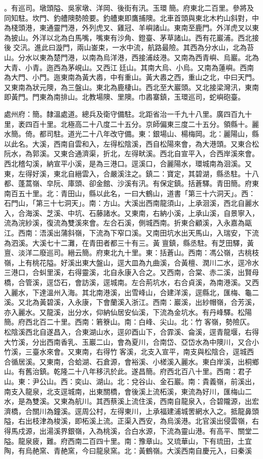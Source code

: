 \begin{pinyinscope}
。有巡司。墩頭隘、吳家墩、洋岡、後街有汛。玉環簡。府東北二百里。參將及同知駐。坎門、釣艚隩勢險要。釣艚東即鷹捕隩。北車首頭與東北木杓山斜對，中為棧頭港，東通靈門港，外列虎叉、雞冠、羊嶼諸山。東南至鹿門。外洋虎叉以東為披山。外洋以北為白馬嘴，嘴東有沙角、鐙臺、茅草諸山。西有花巖浦。西北接後交汛。進此曰漩門，兩山崟束，一水中流，航路最險。其西為分水山，北為苔山。分水以東為楚門港，以南為烏洋港，西接浦歧港。又南為西青嶼、烏巖。北為大青、小青。迤西為茅峴山。又西江廷山。其南大烏、小烏。又南為蓮嶼。西南為大門、小門。迤東南為黃大嶴，中有重山。黃大嶴之西，重山之北，中曰天門。又東南為狀元隩，為三盤山。東北為鹿棲山。西北至大巖頭。又北接梁灣汛，東南即黃門。門東為南排山。北教場隩、里隩。巾嶴寨鎮，玉環巡司，蛇嶼砲臺。

處州府：簡。隸溫處道。總兵及衛守備駐。北距省治一千九十八里。廣四百九十里，袤四百十里。北極高二十八度二十五分。京師偏東三度二十五分。領縣十。麗水簡。倚。都司駐。道光二十八年改守備。東：銀場山、楊梅岡。北：麗陽山，縣以此名。大溪，西南自雲和入，左得松陰溪，西自松陽來會，為大港頭。又東合松阮水，為郭溪。又東合通濟渠，折北，左得畎溪。西北自宣平入，合西岸溪來會。西北稽勾溪，納宣平小溪，是為三港口。逕溪口，合麗陽水，環城南為洄溪。又東，左得好溪，東北自縉雲入，合嚴溪注之。鎮二：寶定，其碧湖，縣丞駐。十八都、蓬蒿嶺、皁阮、庫頭、卻金館、沙溪有汛。有保定鎮。括蒼驛。青田簡。府東南百五十里。北：青田山，縣以此名，一曰大鶴山，道書「第三十六洞天」。西：石門山，「第三十七洞天」。南：方山。大溪出西南龍須山，上承洄溪，西北自麗水入，合海溪、芝溪、中坑、石藤諸水。又東南，右納小溪，上承山溪，自景寧入，流為浣紗溪，復流為雙溪來會。左合石溪，側城西南。折東合顧溪，入永嘉為甌江。西南：浯溪出蒲斜嶺，下流為下窄口溪。又南田坑水出天馬山，入瑞安，下流為泗溪。大溪七十二灘，在青田者都三十有三。黃亶鎮，縣丞駐。有芝田驛，黃亶、淡洋二廢巡司。縉云簡。府東北九十里。東：括蒼山。西南：馮公嶺，古桃枝嶺，上有桃花隘。好溪出東大盤山，逕大皿為九曲溪，合黃檀、潤川二水，逕冷水三港口，合虯里溪，右得靈溪，北自永康入合之。又西南，合棠、赤二溪，出賢母橋，合管溪，逕岱石，會訪溪，逕城南。左合荊坑水，右合貞溪，為南港溪。又西入麗水，下達溫州入海。其北南港溪，出雪峰山，合建洋溪，逕縣北，匯梅、龜二溪。又北為黃碧溪，入永康，下會蘭溪入浙江。西南：巖溪，出紗帽嶺，合芳溪，亦入麗水。又龍溪，出分水，仰納仙居安仙溪，下流為金坑水。有丹峰驛。松陽簡。府西北百二十里。西南：箬簝山。南：白峰、尖山。北：竹客嶺，勢險仄。松陰溪西北自遂昌入，合東湖山水，逕卯酉山下，合霏溪、侖溪，逕青龍堰，右得大竹溪，分出西南香乳、玉巖二山，會為夏川，合南岱、亞岱水為中隩川，又合小竹溪，三臺水來會。又東南，右得竹客溪，北支入宣平，南支與松陰合，逕城西合循居溪。又東南，合蛤湖、石倉源，會裕溪、小槎溪入麗水。東白岸溪，出桐鄉山。有舊治鎮。乾隆二十八年移汛於此。遂昌簡。府西北百八十里。西南：君子山。東：尹公山。西：奕山、湖山。北：兌谷山、金石巖。南：貴義嶺，前溪出，南支入龍泉，北支逕城南，出東關橋，會後溪上流柘溪，東流為好川，匯梅山二水，是為雙溪。又東為航川。其西蔡溪上流住溪，西南自龍泉入，合碧隴源，出宏濟橋，合關川為鐘溪。逕周公村，左得東川，上承福建浦城罟網水入之。抵龍鼻頭隘，右出枝津為梭溪，即柘溪上流。正渠入西安，為烏溪港。北官溪出侵雲嶺，右得馬戍源，出湯溪界銀嶺，入為桃溪，合白水源，下流為靈山港。有高平、關堂二隘。龍泉疲，難。府西南二百四十里。南：豫章山。又琉華山，下有琉田，土宜陶，有烏赩窯、青赩窯，今曰龍泉窯。北：黃鶴嶺。大溪西南自慶元入，曰秦溪
\end{pinyinscope}

